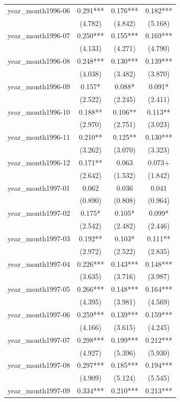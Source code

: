 \documentclass[
  norsk,
  a4paper,
]{article}
\begin{document}
\begin{table}
\begin{tabular*}{\linewidth}{@{\extracolsep{\fill}}lccc}
year\_month1996-06 & 0.291*** & 0.176*** & 0.182*** \\ 
 & (4.782) & (4.842) & (5.168) \\ 
year\_month1996-07 & 0.250*** & 0.155*** & 0.169*** \\ 
 & (4.133) & (4.271) & (4.790) \\ 
year\_month1996-08 & 0.248*** & 0.130*** & 0.139*** \\ 
 & (4.038) & (3.482) & (3.870) \\ 
year\_month1996-09 & 0.157* & 0.088* & 0.091* \\ 
 & (2.522) & (2.245) & (2.411) \\ 
year\_month1996-10 & 0.188** & 0.106** & 0.113** \\ 
 & (2.970) & (2.751) & (3.023) \\ 
year\_month1996-11 & 0.210** & 0.125** & 0.130*** \\ 
 & (3.262) & (3.070) & (3.323) \\ 
year\_month1996-12 & 0.171** & 0.063 & 0.073+ \\ 
 & (2.642) & (1.532) & (1.842) \\ 
year\_month1997-01 & 0.062 & 0.036 & 0.041 \\ 
 & (0.890) & (0.808) & (0.964) \\ 
year\_month1997-02 & 0.175* & 0.105* & 0.099* \\ 
 & (2.542) & (2.482) & (2.446) \\ 
year\_month1997-03 & 0.192** & 0.103* & 0.111** \\ 
 & (2.972) & (2.522) & (2.835) \\ 
year\_month1997-04 & 0.226*** & 0.143*** & 0.148*** \\ 
 & (3.635) & (3.716) & (3.987) \\ 
year\_month1997-05 & 0.266*** & 0.148*** & 0.164*** \\ 
 & (4.395) & (3.981) & (4.569) \\ 
year\_month1997-06 & 0.259*** & 0.139*** & 0.159*** \\ 
 & (4.166) & (3.615) & (4.245) \\ 
year\_month1997-07 & 0.298*** & 0.199*** & 0.212*** \\ 
 & (4.927) & (5.396) & (5.930) \\ 
year\_month1997-08 & 0.297*** & 0.185*** & 0.194*** \\ 
 & (4.909) & (5.124) & (5.545) \\ 
year\_month1997-09 & 0.334*** & 0.210*** & 0.213*** \\ 

\end{tabular*}
\end{table}
\end{document}
